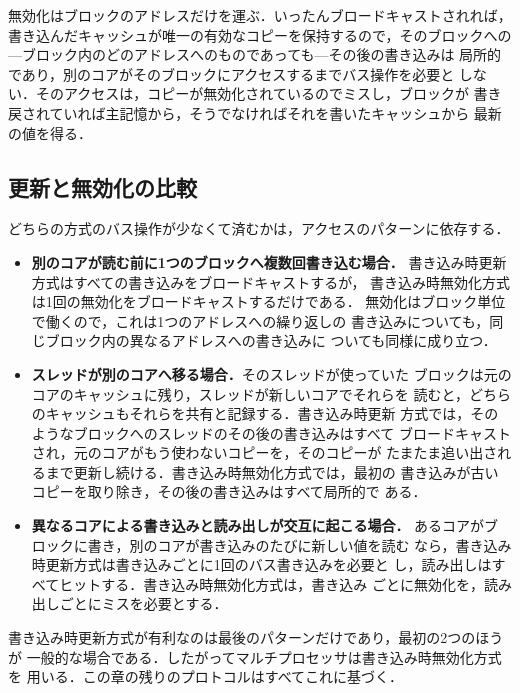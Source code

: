 \documentclass[../main.tex]{subfiles}
\begin{document}
無効化はブロックのアドレスだけを運ぶ．いったんブロードキャストされれば，
書き込んだキャッシュが唯一の有効なコピーを保持するので，そのブロックへの
---ブロック内のどのアドレスへのものであっても---その後の書き込みは
局所的であり，別のコアがそのブロックにアクセスするまでバス操作を必要と
しない．そのアクセスは，コピーが無効化されているのでミスし，ブロックが
書き戻されていれば主記憶から，そうでなければそれを書いたキャッシュから
最新の値を得る．

\subsection{更新と無効化の比較}

どちらの方式のバス操作が少なくて済むかは，アクセスのパターンに依存する．
\begin{itemize}
  \item \textbf{別のコアが読む前に1つのブロックへ複数回書き込む場合．}
    書き込み時更新方式はすべての書き込みをブロードキャストするが，
    書き込み時無効化方式は1回の無効化をブロードキャストするだけである．
    無効化はブロック単位で働くので，これは1つのアドレスへの繰り返しの
    書き込みについても，同じブロック内の異なるアドレスへの書き込みに
    ついても同様に成り立つ．
  \item \textbf{スレッドが別のコアへ移る場合．}そのスレッドが使っていた
    ブロックは元のコアのキャッシュに残り，スレッドが新しいコアでそれらを
    読むと，どちらのキャッシュもそれらを共有と記録する．書き込み時更新
    方式では，そのようなブロックへのスレッドのその後の書き込みはすべて
    ブロードキャストされ，元のコアがもう使わないコピーを，そのコピーが
    たまたま追い出されるまで更新し続ける．書き込み時無効化方式では，最初の
    書き込みが古いコピーを取り除き，その後の書き込みはすべて局所的で
    ある．
  \item \textbf{異なるコアによる書き込みと読み出しが交互に起こる場合．}
    あるコアがブロックに書き，別のコアが書き込みのたびに新しい値を読む
    なら，書き込み時更新方式は書き込みごとに1回のバス書き込みを必要と
    し，読み出しはすべてヒットする．書き込み時無効化方式は，書き込み
    ごとに無効化を，読み出しごとにミスを必要とする．
\end{itemize}
書き込み時更新方式が有利なのは最後のパターンだけであり，最初の2つのほうが
一般的な場合である．したがってマルチプロセッサは書き込み時無効化方式を
用いる．この章の残りのプロトコルはすべてこれに基づく．
\end{document}
